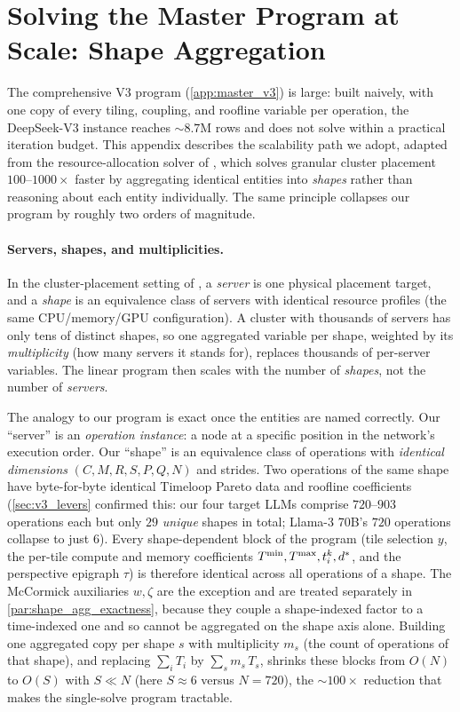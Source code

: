 \section{Solving the Master Program at Scale: Shape Aggregation}
\label{app:shape_agg}

The comprehensive V3 program (\cref{app:master_v3}) is large: built naively, with
one copy of every tiling, coupling, and roofline variable per operation, the
DeepSeek-V3 instance reaches ${\sim}8.7$M rows and does not solve within a
practical iteration budget. This appendix describes the scalability path we adopt,
adapted from the resource-allocation solver of \citet{cvxcluster2026}, which solves
granular cluster placement $100$--$1000\times$ faster by aggregating identical
entities into \emph{shapes} rather than reasoning about each entity individually.
The same principle collapses our program by roughly two orders of magnitude.

\paragraph{Servers, shapes, and multiplicities.}
In the cluster-placement setting of \citet{cvxcluster2026}, a \emph{server} is one
physical placement target, and a \emph{shape} is an equivalence class of servers
with identical resource profiles (the same CPU/memory/GPU configuration). A cluster
with thousands of servers has only tens of distinct shapes, so one aggregated
variable per shape, weighted by its \emph{multiplicity} (how many servers it
stands for), replaces thousands of per-server variables. The linear program then
scales with the number of \emph{shapes}, not the number of \emph{servers}.

The analogy to our program is exact once the entities are named correctly. Our
``server'' is an \emph{operation instance}: a node at a specific position in the
network's execution order. Our ``shape'' is an equivalence class of operations with
\emph{identical dimensions} $(C,M,R,S,P,Q,N)$ and strides. Two operations of the
same shape have byte-for-byte identical Timeloop Pareto data and roofline
coefficients (\cref{sec:v3_levers} confirmed this: our four target LLMs comprise
$720$--$903$ operations each but only $29$ \emph{unique} shapes in total; Llama-3
70B's $720$ operations collapse to just $6$). Every shape-dependent block of the
program (tile selection $y$, the per-tile compute and memory coefficients
$T^{\min},T^{\max},t_i^k,d^{\ast}$, and the perspective epigraph $\tau$) is therefore
identical across all operations of a shape. The McCormick auxiliaries $w,\zeta$
are the exception and are treated separately in
\cref{par:shape_agg_exactness}, because they couple a shape-indexed factor to a
time-indexed one and so cannot be aggregated on the shape axis alone. Building
one aggregated copy per shape $s$ with multiplicity $m_s$ (the count of operations
of that shape), and replacing $\sum_i T_i$ by $\sum_s m_s\, T_s$, shrinks these
blocks from $O(N)$ to $O(S)$ with $S \ll N$ (here $S\approx 6$ versus $N=720$), the
${\sim}100\times$ reduction that makes the single-solve program tractable.

